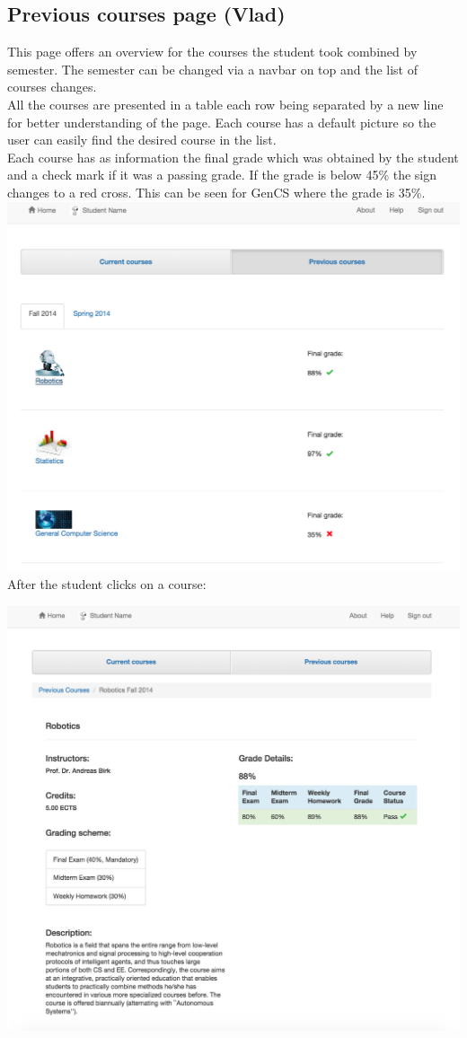 \subsection{Previous courses page (Vlad)}

This page offers an overview for the courses the student took combined by semester. The semester can be changed via a navbar on top and the list of courses changes.\\
All the courses are presented in a table each row being separated by a new line for better understanding of the page. Each course has a default picture so the user can easily find the desired course in the list. \\
Each course has as information the final grade which was obtained by the student and a check mark if it was a passing grade. If the grade is below 45\% the sign changes to a red cross. This can be seen for GenCS where the grade is 35\%.\\
\includegraphics[width=.85\textwidth]{screenshots/PrevoiusCoursesOverview.png}
\newpage
After the student clicks on a course:

\includegraphics[width=.85\textwidth]{screenshots/PreviousCourseDetail.png}

